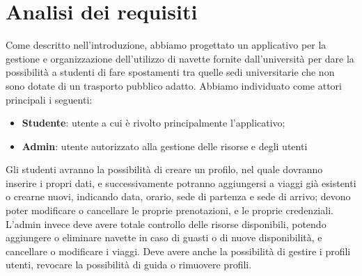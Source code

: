 \section{Analisi dei requisiti}
Come descritto nell'introduzione, abbiamo progettato un applicativo per la gestione e organizzazione dell'utilizzo di navette fornite dall'università per dare la possibilità a studenti di fare spostamenti tra quelle sedi universitarie che non sono dotate di un trasporto pubblico adatto.
Abbiamo individuato come attori principali i seguenti:
\begin{itemize}
    \item \textbf{Studente}: utente a cui è rivolto principalmente l'applicativo; 
    \item \textbf{Admin}:  utente autorizzato alla gestione delle risorse e degli utenti
\end{itemize}
Gli studenti avranno la possibilità di creare un profilo, nel quale dovranno inserire i propri dati, e successivamente potranno aggiungersi a viaggi già esistenti o crearne nuovi, indicando data, orario, sede di partenza e sede di arrivo; devono poter modificare o cancellare le proprie prenotazioni, e le proprie credenziali.
\\L'admin invece deve avere totale controllo delle risorse disponibili, potendo aggiungere o eliminare navette in caso di guasti o di nuove disponibilità, e cancellare o modificare i viaggi. Deve avere anche la possibilità di gestire i profili utenti, revocare la possibilità di guida o rimuovere profili.
